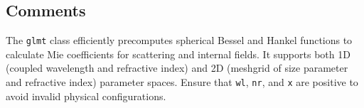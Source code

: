 \subsection{Comments}
The \texttt{glmt} class efficiently precomputes spherical Bessel and Hankel functions to calculate Mie coefficients for scattering and internal fields. It supports both 1D (coupled wavelength and refractive index) and 2D (meshgrid of size parameter and refractive index) parameter spaces. Ensure that \texttt{wl}, \texttt{nr}, and \texttt{x} are positive to avoid invalid physical configurations.